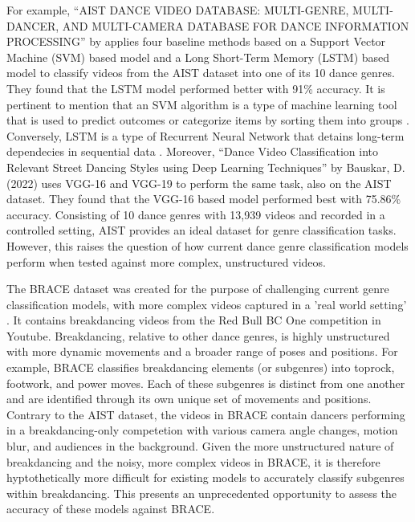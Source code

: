 \documentclass[12pt]{article}
\begin{document}
\par For example, “AIST DANCE VIDEO DATABASE: MULTI-GENRE, MULTI-DANCER, AND MULTI-CAMERA DATABASE FOR DANCE INFORMATION PROCESSING” by \Textcite{aist} applies four baseline methods based on a Support Vector Machine (SVM) based model and a Long Short-Term Memory (LSTM) based model to classify videos from the AIST dataset into one of its 10 dance genres. They found that the LSTM model performed better with 91\% accuracy. It is pertinent to mention that an SVM algorithm is a type of machine learning tool that is used to predict outcomes or categorize items by sorting them into groups \parencite{svm}. Conversely, LSTM  is a type of Recurrent Neural Network that detains long-term dependecies in sequential data \parencite{Banoula_2023} \parencite{sherstinsky2020fundamentals}. Moreover, “Dance Video Classification into Relevant Street Dancing Styles using Deep Learning Techniques” by Bauskar, D. (2022) uses VGG-16 and VGG-19 to perform the same task, also on the AIST dataset. They found that the VGG-16 based model performed best with 75.86\% accuracy. Consisting of 10 dance genres with 13,939 videos \Textcite{aist} and recorded in a controlled setting, AIST provides an ideal dataset for genre classification tasks. However, this raises the question of how current dance genre classification models perform when tested against more complex, unstructured videos.
\vspace{5mm}

\par The BRACE dataset was created for the purpose of challenging current genre classification models, with more complex videos captured in a 'real world setting' \Textcite{brace}. It contains breakdancing videos from the Red Bull BC One competition in Youtube. Breakdancing, relative to other dance genres, is highly unstructured with more dynamic movements and a broader range of poses and positions. For example, BRACE classifies breakdancing elements (or subgenres) into toprock, footwork, and power moves. Each of these subgenres is distinct from one another and are identified through its own unique set of movements and positions. Contrary to the AIST dataset, the videos in BRACE contain dancers performing in a breakdancing-only competetion with various camera angle changes, motion blur, and audiences in the background. Given the more unstructured nature of breakdancing and the noisy, more complex videos in BRACE, it is therefore hyptothetically more difficult for existing models to accurately classify subgenres within breakdancing. This presents an unprecedented opportunity to assess the accuracy of these models against BRACE.
\vspace{5mm}
\end{document}
